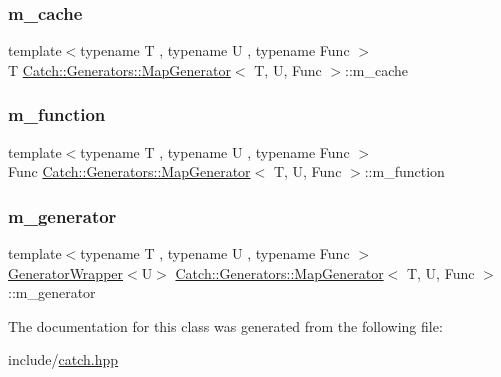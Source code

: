 \subsubsection{\texorpdfstring{m\_cache}{m\_cache}}
{\footnotesize\ttfamily template$<$typename T , typename U , typename Func $>$ \\
T \mbox{\hyperlink{class_catch_1_1_generators_1_1_map_generator}{Catch\+::\+Generators\+::\+Map\+Generator}}$<$ T, U, Func $>$\+::m\+\_\+cache\hspace{0.3cm}{\ttfamily [private]}}

\mbox{\label{class_catch_1_1_generators_1_1_map_generator_add8fa24bfa56705c798fe70f4c6235ff}} 
\subsubsection{\texorpdfstring{m\_function}{m\_function}}
{\footnotesize\ttfamily template$<$typename T , typename U , typename Func $>$ \\
Func \mbox{\hyperlink{class_catch_1_1_generators_1_1_map_generator}{Catch\+::\+Generators\+::\+Map\+Generator}}$<$ T, U, Func $>$\+::m\+\_\+function\hspace{0.3cm}{\ttfamily [private]}}

\mbox{\label{class_catch_1_1_generators_1_1_map_generator_a7a4c986b7721df82559d5c3cbb3bdb66}} 
\subsubsection{\texorpdfstring{m\_generator}{m\_generator}}
{\footnotesize\ttfamily template$<$typename T , typename U , typename Func $>$ \\
\mbox{\hyperlink{class_catch_1_1_generators_1_1_generator_wrapper}{Generator\+Wrapper}}$<$U$>$ \mbox{\hyperlink{class_catch_1_1_generators_1_1_map_generator}{Catch\+::\+Generators\+::\+Map\+Generator}}$<$ T, U, Func $>$\+::m\+\_\+generator\hspace{0.3cm}{\ttfamily [private]}}



The documentation for this class was generated from the following file\+:\begin{DoxyCompactItemize}
\item 
include/\mbox{\hyperlink{catch_8hpp}{catch.\+hpp}}\end{DoxyCompactItemize}
